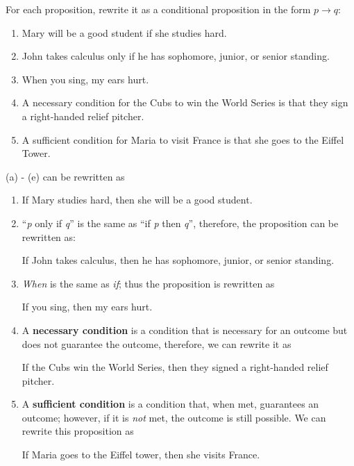 For each proposition, rewrite it as a conditional proposition in the form $p \rightarrow q$:

\begin{enumerate}[label=(\alph*)]
\item Mary will be a good student if she studies hard.
\item John takes calculus only if he has sophomore, junior, or senior standing.
\item When you sing, my ears hurt.
\item A necessary condition for the Cubs to win the World Series is that they sign a right-handed relief pitcher.
\item A sufficient condition for Maria to visit France is that she goes to the Eiffel Tower.
\end{enumerate}

(a) - (e) can be rewritten as

\begin{enumerate}[label=(\alph*)]
\item If Mary studies hard, then she will be a good student.
\item ``\textit{p} only if \textit{q}'' is the same as ``if \textit{p} then \textit{q}'', therefore, the proposition can be rewritten as:
\begin{center}
If John takes calculus, then he has sophomore, junior, or senior standing.
\end{center}
\item \textit{When} is the same as \textit{if}; thus the proposition is rewritten as
\begin{center}
If you sing, then my ears hurt.
\end{center}
\item A \textbf{necessary condition} is a condition that is necessary for an outcome but does not guarantee the outcome, therefore, we can rewrite it as
\begin{center}
If the Cubs win the World Series, then they signed a right-handed relief pitcher.
\end{center}
\item A \textbf{sufficient condition} is a condition that, when met, guarantees an outcome; however, if it is \textit{not} met, the outcome is still possible.  We can rewrite this proposition as 
\begin{center}
If Maria goes to the Eiffel tower, then she visits France.
\end{center}
\end{enumerate}

